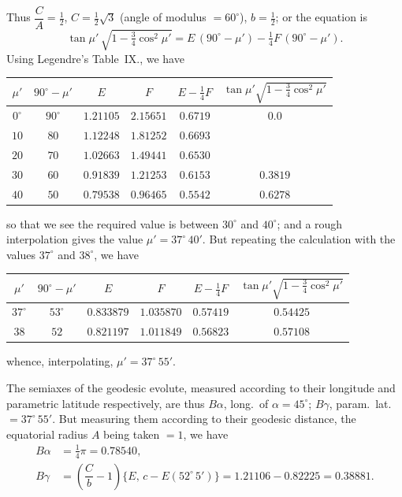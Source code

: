 \documentclass[11pt,a4paper]{article}
\begin{document}
Thus $\dfrac{C}{A} = \tfrac{1}{2}$, $C = \tfrac{1}{2}\sqrt{3}$ (angle of modulus
$= 60^\circ$), $b = \tfrac{1}{2}$; or the equation is
\[
\tan\mu'\,\sqrt{1 - \tfrac{3}{4}\cos^2\mu'}
= E\,(90^\circ - \mu') - \tfrac{1}{4}F\,(90^\circ - \mu').
\]
Using Legendre's Table~IX., we have
\begin{center}
\begin{tabular}{c c c c c c}
\toprule
$\mu'$ & $90^\circ - \mu'$ & $E$ & $F$ & $E - \tfrac{1}{4}F$ &
$\tan\mu'\sqrt{1 - \tfrac{3}{4}\cos^2\mu'}$ \\
\midrule
$0^\circ$  & $90^\circ$ & $1.21105$ & $2.15651$ & $0.6719$ & $0.0$    \\
$10$       & $80$       & $1.12248$ & $1.81252$ & $0.6693$ &          \\
$20$       & $70$       & $1.02663$ & $1.49441$ & $0.6530$ &          \\
$30$       & $60$       & $0.91839$ & $1.21253$ & $0.6153$ & $0.3819$ \\
$40$       & $50$       & $0.79538$ & $0.96465$ & $0.5542$ & $0.6278$ \\
\bottomrule
\end{tabular}
\end{center}
so that we see the required value is between $30^\circ$ and $40^\circ$; and a
rough interpolation gives the value $\mu' = 37^\circ\,40'$.  But repeating the
calculation with the values $37^\circ$ and $38^\circ$, we have
\begin{center}
\begin{tabular}{c c c c c c}
\toprule
$\mu'$ & $90^\circ - \mu'$ & $E$ & $F$ & $E - \tfrac{1}{4}F$ &
$\tan\mu'\sqrt{1 - \tfrac{3}{4}\cos^2\mu'}$ \\
\midrule
$37^\circ$ & $53^\circ$ & $0.833879$ & $1.035870$ & $0.57419$ & $0.54425$ \\
$38$       & $52$       & $0.821197$ & $1.011849$ & $0.56823$ & $0.57108$ \\
\bottomrule
\end{tabular}
\end{center}
whence, interpolating, $\mu' = 37^\circ\,55'$.

\medskip

The semiaxes of the geodesic evolute, measured according to their longitude
and parametric latitude respectively, are thus $B\alpha$, long.\ of
$\alpha = 45^\circ$; $B\gamma$, param.\ lat.\ $= 37^\circ\,55'$.  But measuring
them according to their geodesic distance, the equatorial radius $A$ being
taken $= 1$, we have
\begin{align*}
B\alpha &= \tfrac{1}{4}\pi = 0.78540, \\
B\gamma &= \left(\dfrac{C}{b} - 1\right)\{E,\,c - E(52^\circ\,5')\}
        = 1.21106 - 0.82225 = 0.38881.
\end{align*}
\end{document}
